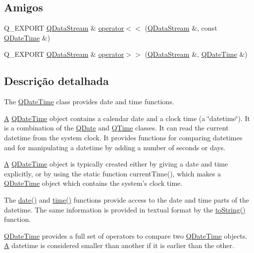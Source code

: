 \subsection*{Amigos}
\begin{DoxyCompactItemize}
\item 
Q\-\_\-\-E\-X\-P\-O\-R\-T \hyperlink{class_q_data_stream}{Q\-Data\-Stream} \& \hyperlink{class_q_date_time_ac4f6ae497406f297a47183ecc265816a}{operator$<$$<$} (\hyperlink{class_q_data_stream}{Q\-Data\-Stream} \&, const \hyperlink{class_q_date_time}{Q\-Date\-Time} \&)
\item 
Q\-\_\-\-E\-X\-P\-O\-R\-T \hyperlink{class_q_data_stream}{Q\-Data\-Stream} \& \hyperlink{class_q_date_time_afb6acd9837e7b1d8fc54e6665a9adc29}{operator$>$$>$} (\hyperlink{class_q_data_stream}{Q\-Data\-Stream} \&, \hyperlink{class_q_date_time}{Q\-Date\-Time} \&)
\end{DoxyCompactItemize}


\subsection{Descrição detalhada}
The \hyperlink{class_q_date_time}{Q\-Date\-Time} class provides date and time functions. 

\hyperlink{class_a}{A} \hyperlink{class_q_date_time}{Q\-Date\-Time} object contains a calendar date and a clock time (a \char`\"{}datetime\char`\"{}). It is a combination of the \hyperlink{class_q_date}{Q\-Date} and \hyperlink{class_q_time}{Q\-Time} classes. It can read the current datetime from the system clock. It provides functions for comparing datetimes and for manipulating a datetime by adding a number of seconds or days.

\hyperlink{class_a}{A} \hyperlink{class_q_date_time}{Q\-Date\-Time} object is typically created either by giving a date and time explicitly, or by using the static function current\-Time(), which makes a \hyperlink{class_q_date_time}{Q\-Date\-Time} object which contains the system's clock time.

The \hyperlink{class_q_date_time_a4528e95d53cf1e50ab2b5b3ef717fad5}{date()} and \hyperlink{class_q_date_time_a825af88d1599b9f40f7619b5c3f3b702}{time()} functions provide access to the date and time parts of the datetime. The same information is provided in textual format by the \hyperlink{class_q_date_time_a8aabbf2e3c7be33fa5769a5eab3eef6f}{to\-String()} function.

\hyperlink{class_q_date_time}{Q\-Date\-Time} provides a full set of operators to compare two \hyperlink{class_q_date_time}{Q\-Date\-Time} objects. \hyperlink{class_a}{A} datetime is considered smaller than another if it is earlier than the other.

